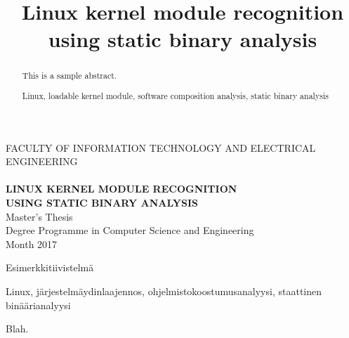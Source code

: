 \documentclass[a4paper, 12pt,titlepage]{dithesis}
\title{Linux kernel module recognition using static binary analysis}
\begin{document}
\begin{titlepage}
	{\sffamily\fontsize{9}{1pt}\selectfont FACULTY OF INFORMATION TECHNOLOGY AND ELECTRICAL ENGINEERING\\}
	\vspace{65 mm}
	{\textbf{\fontsize{16}{19pt}\selectfont \getfirstname\ \getlastname }\\}
	\vspace{15 mm}
	{\textbf{\fontsize{18}{22pt}\selectfont LINUX KERNEL MODULE RECOGNITION\\USING STATIC BINARY ANALYSIS\\}}
	\vspace{60 mm}
	{\fontsize{14}{17}\selectfont Master's Thesis \\Degree Programme in Computer Science and Engineering \\ Month 2017\\}
\end{titlepage}


\begin{abstract}
This is a sample abstract.

\keywords Linux, loadable kernel module, software composition analysis, static binary analysis

\end{abstract}

\begin{tiivistelma}
Esimerkkitiivistelmä

\avainsanat Linux, järjestelmäydinlaajennos, ohjelmistokoostumusanalyysi, staattinen binäärianalyysi
\end{tiivistelma}


\sisluettelo

Blah.



\setlongtables
\begin{longtable}[l]{p{3cm}p{}}



\end{longtable}
\setcounter{table}{0}
\end{document}
